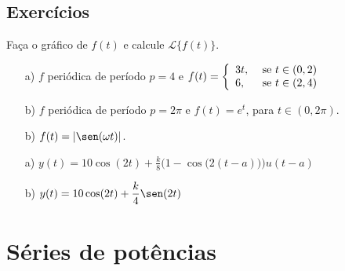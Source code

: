 \subsection*{Exercícios}
\begin{exer}
Faça o gráfico de $f(t)$ e calcule $\mathcal{L}\big\{f(t)\big\}$.
\begin{itemize}
  \item[a)] $f$ periódica de período $p=4$ e $\displaystyle f(t) = \left\{
                                                                      \begin{array}{ll}
                                                                        3t, & \hbox{ se } t \in (0,2) \\
                                                                        6, & \hbox{ se } t \in (2,4)
                                                                      \end{array}
                                                                    \right.
$
  \item[b)] $f$ periódica de período $p=2\pi$ e $\displaystyle f(t) = e^t$, para $t \in (0,2\pi)$.
  \item[b)] $\displaystyle f(t) = |\sen (\omega t)|$.
\end{itemize}
\end{exer}
\begin{resp}
 \begin{itemize}
  \item[a)] $\displaystyle y(t) = 10 \cos (2t) + \frac{k}{8} \Big( 1 - \cos \big(2(t-a)\big) \Big)u(t-a) $
  \item[b)] $\displaystyle y(t) = 10 \cos (2t) + \frac{k}{4} \sen(2t)$
 \end{itemize}
\end{resp}

\section{Séries de potências}
